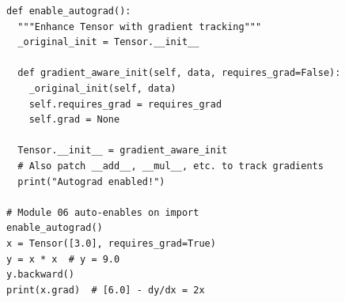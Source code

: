 \documentclass[10pt,twocolumn]{article}
\begin{document}
\begin{lstlisting}[caption={\textbf{Autograd Enhancement.} Module 06 monkey-patches Tensor to add gradient tracking. The original \texttt{\_\_init\_\_} is wrapped to accept \texttt{requires\_grad}, and operations are enhanced to build computation graphs.},label={lst:activation},float=t]
def enable_autograd():
  """Enhance Tensor with gradient tracking"""
  _original_init = Tensor.__init__

  def gradient_aware_init(self, data, requires_grad=False):
    _original_init(self, data)
    self.requires_grad = requires_grad
    self.grad = None

  Tensor.__init__ = gradient_aware_init
  # Also patch __add__, __mul__, etc. to track gradients
  print("Autograd enabled!")

# Module 06 auto-enables on import
enable_autograd()
x = Tensor([3.0], requires_grad=True)
y = x * x  # y = 9.0
y.backward()
print(x.grad)  # [6.0] - dy/dx = 2x
\end{lstlisting}
\end{document}
